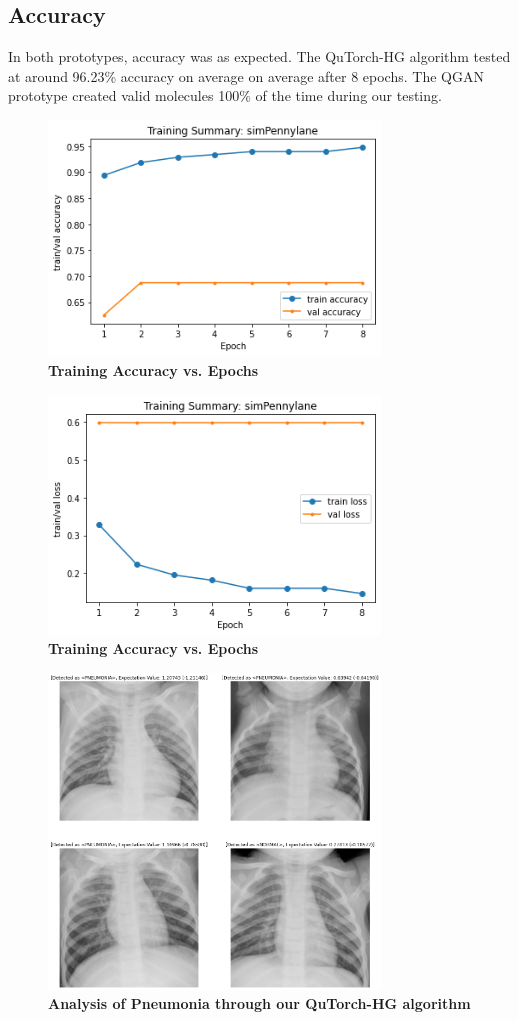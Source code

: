 \documentclass{scrartcl}
\begin{document}
\subsection{Accuracy}
\label{sec:org2aa665c}

In both prototypes, accuracy was as expected. The QuTorch-HG algorithm tested at around 96.23\% accuracy on average on average after 8 epochs. The QGAN prototype created valid molecules 100\% of the time during our testing.

\begin{figure}[htbp]
\centering
\includegraphics[width=250pt]{./assets/output1.png}
\caption{\textbf{Training Accuracy vs. Epochs}}
\end{figure}
\begin{figure}[htbp]
\centering
\includegraphics[width=250pt]{./assets/output2.png}
\caption{\textbf{Training Accuracy vs. Epochs}}
\end{figure}

\begin{figure}[htbp]
\centering
\includegraphics[width=250pt]{./assets/output3.png}
\caption{\textbf{Analysis of Pneumonia through our QuTorch-HG algorithm}}
\end{figure}
\end{document}
